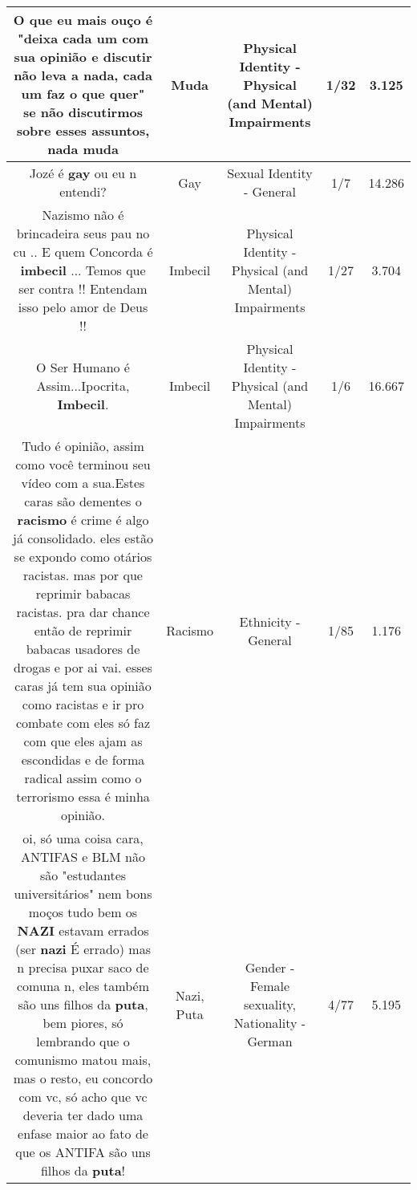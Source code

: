 \documentclass[11pt]{article}
\newlength\mylength
\begin{document}
\begin{center}
\begin{longtable}{|C{.65\mylength}|C{.30\mylength}|C{.12\mylength}|C{.12\mylength}|C{.12\mylength}|}
  \small O que eu mais ouço é "deixa cada um com sua opinião e discutir não leva a nada, cada um faz o que quer" se não discutirmos sobre esses assuntos, nada muda\normalsize   & Muda & Physical Identity - Physical (and Mental) Impairments & 1/32 & 3.125 \\  \hline
  \small Jozé é \textbf{gay} ou eu n entendi?\normalsize   & Gay & Sexual Identity - General & 1/7 & 14.286 \\  \hline
  \small Nazismo não é brincadeira seus pau no cu .. E quem Concorda é \textbf{imbecil} ... Temos que ser contra !! Entendam isso pelo amor de Deus !!\normalsize   & Imbecil & Physical Identity - Physical (and Mental) Impairments & 1/27 & 3.704 \\  \hline
  \small O Ser Humano é Assim...Ipocrita, \textbf{Imbecil}.\normalsize   & Imbecil & Physical Identity - Physical (and Mental) Impairments & 1/6 & 16.667 \\  \hline
  \small Tudo é opinião, assim como você terminou seu vídeo  com a sua.Estes caras são dementes o \textbf{racismo} é crime é algo já consolidado. eles estão se expondo como otários racistas. mas por que reprimir babacas racistas. pra dar chance então de reprimir babacas usadores de drogas e por ai vai. esses caras já tem sua opinião  como racistas e ir pro combate com eles só faz  com que eles ajam as escondidas e de forma radical assim como o terrorismo essa é minha opinião.\normalsize   & Racismo & Ethnicity - General & 1/85 & 1.176 \\  \hline
  \small oi, só uma coisa cara, ANTIFAS e BLM não são "estudantes universitários" nem bons moços tudo bem os \textbf{NAZI} estavam errados (ser \textbf{nazi} É errado) mas n precisa puxar saco de comuna n, eles também são uns filhos da \textbf{puta}, bem piores, só lembrando que o comunismo matou mais, mas o resto, eu concordo com vc, só acho que vc deveria ter dado uma enfase maior ao fato de que os ANTIFA são uns filhos da \textbf{puta}!\normalsize   & Nazi, Puta & Gender - Female sexuality, Nationality - German & 4/77 & 5.195 \\  \hline

\end{longtable}
\end{center}
\end{document}
